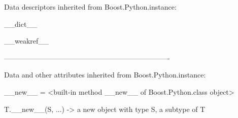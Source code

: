 \documentclass[letterpaper,10pt,english]{sphinxmanual}
\begin{document}
\begin{description}
\begin{description}
\begin{DUlineblock}{0em}
\item[] Data descriptors inherited from Boost.Python.instance:
\item[] 
\item[] \_\_dict\_\_
\item[] 
\item[] \_\_weakref\_\_
\item[] 
\item[] ----------------------------------------------------------------------
\item[] Data and other attributes inherited from Boost.Python.instance:
\item[] 
\item[] \_\_new\_\_ = \textless{}built-in method \_\_new\_\_ of Boost.Python.class object\textgreater{}
\item[]
\begin{DUlineblock}{\DUlineblockindent}
\item[] T.\_\_new\_\_(S, ...) -\textgreater{} a new object with type S, a subtype of T
\end{DUlineblock}
\end{DUlineblock}


\end{description}
\end{description}
\end{document}
